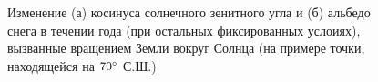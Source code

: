 \documentclass[a4paper, fontsize=14pt]{scrartcl}
\begin{document}
\begin{figure}[h]
    \begin{minipage}[h]{0.49\linewidth}
    \end{minipage}
    \hfill
    \begin{minipage}[h]{0.49\linewidth}
    \end{minipage}
    \caption{Изменение (а) косинуса солнечного зенитного угла и (б) альбедо снега в течении года (при остальных фиксированных услоиях), вызванные вращением Земли вокруг Солнца (на примере точки, находящейся на $70\degree$ С.Ш.)}
    \label{fig:image}
\end{figure}
\end{document}
